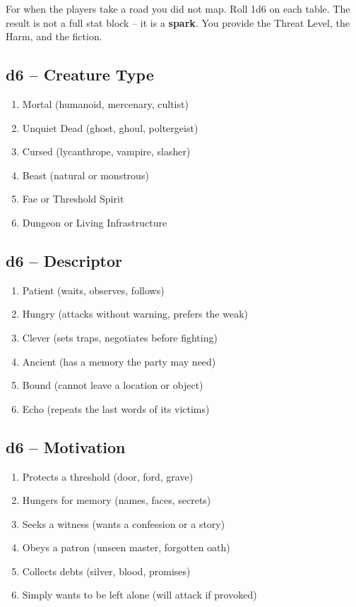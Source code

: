 \noindent For when the players take a road you did not map. Roll 1d6 on each table. The result is not a full stat block -- it is a \textbf{spark}. You provide the Threat Level, the Harm, and the fiction.

\subsection*{d6 -- Creature Type}
\begin{enumerate}[label=\arabic*.]
    \item Mortal (humanoid, mercenary, cultist)
    \item Unquiet Dead (ghost, ghoul, poltergeist)
    \item Cursed (lycanthrope, vampire, slasher)
    \item Beast (natural or monstrous)
    \item Fae or Threshold Spirit
    \item Dungeon or Living Infrastructure
\end{enumerate}

\subsection*{d6 -- Descriptor}
\begin{enumerate}[label=\arabic*.]
    \item Patient (waits, observes, follows)
    \item Hungry (attacks without warning, prefers the weak)
    \item Clever (sets traps, negotiates before fighting)
    \item Ancient (has a memory the party may need)
    \item Bound (cannot leave a location or object)
    \item Echo (repeats the last words of its victims)
\end{enumerate}

\subsection*{d6 -- Motivation}
\begin{enumerate}[label=\arabic*.]
    \item Protects a threshold (door, ford, grave)
    \item Hungers for memory (names, faces, secrets)
    \item Seeks a witness (wants a confession or a story)
    \item Obeys a patron (unseen master, forgotten oath)
    \item Collects debts (silver, blood, promises)
    \item Simply wants to be left alone (will attack if provoked)
\end{enumerate}

